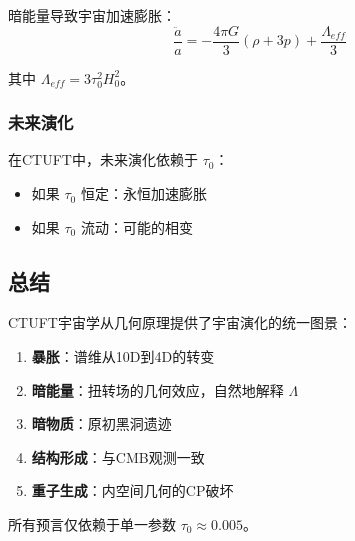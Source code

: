 暗能量导致宇宙加速膨胀：
\begin{equation}
    \frac{\ddot{a}}{a} = -\frac{4\pi G}{3}(\rho + 3p) + \frac{\Lambda_{eff}}{3}
\end{equation}

其中 $\Lambda_{eff} = 3\tau_0^2 H_0^2$。

\subsubsection{未来演化}

在CTUFT中，未来演化依赖于 $\tau_0$：
\begin{itemize}
    \item 如果 $\tau_0$ 恒定：永恒加速膨胀
    \item 如果 $\tau_0$ 流动：可能的相变
\end{itemize}

\subsection{总结}

CTUFT宇宙学从几何原理提供了宇宙演化的统一图景：
\begin{enumerate}
    \item \textbf{暴胀}：谱维从10D到4D的转变
    \item \textbf{暗能量}：扭转场的几何效应，自然地解释 $\Lambda$
    \item \textbf{暗物质}：原初黑洞遗迹
    \item \textbf{结构形成}：与CMB观测一致
    \item \textbf{重子生成}：内空间几何的CP破坏
\end{enumerate}

所有预言仅依赖于单一参数 $\tau_0 \approx 0.005$。
